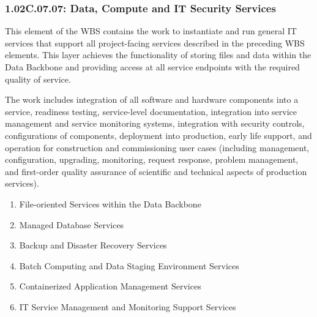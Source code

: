 \subsubsection*{1.02C.07.07: Data, Compute and IT Security Services}

This element of the WBS contains the work to instantiate and run general IT services that support all project-facing services described in the preceding WBS elements.
This layer achieves the functionality of storing files and data within the Data Backbone and providing access at all service endpoints with the required quality of service.

The work includes integration of all software and hardware components into a service, readiness testing, service-level documentation, integration into service management and service monitoring systems, integration with security controls, configurations of components, deployment into production, early life support, and operation for construction and commissioning user cases (including management, configuration, upgrading, monitoring, request response, problem management, and first-order quality assurance of scientific and technical aspects of production services).

\begin{enumerate}

  \item{File-oriented Services within the Data Backbone}
  \item{Managed Database Services}
  \item{Backup and Disaster Recovery Services}
  \item{Batch Computing and Data Staging Environment Services}
  \item{Containerized Application Management Services}
  \item{IT Service Management and Monitoring Support Services}

\end{enumerate}

